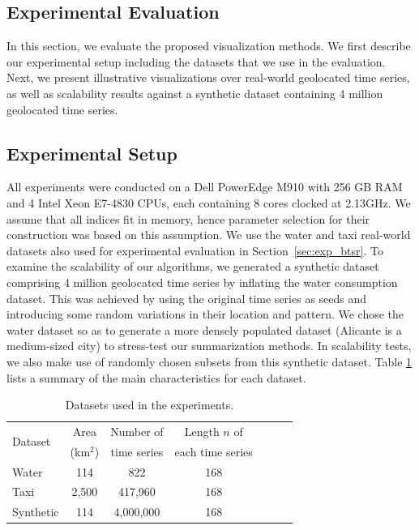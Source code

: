 
\subsection{Experimental Evaluation}
\label{sec:evaluation}

\graphicspath{{Papers/ElsevierBigDataResearch/}}

In this section, we evaluate the proposed visualization methods. We first describe our experimental setup including the datasets that we use in the evaluation. Next, we present illustrative visualizations over real-world geolocated time series, as well as scalability results against a synthetic dataset containing 4 million geolocated time series.

\subsection{Experimental Setup}
\label{subsec:exp_setup}

All experiments were conducted on a Dell PowerEdge M910 with 256 GB RAM and 4 Intel Xeon E7-4830 CPUs, each containing 8 cores clocked at 2.13GHz. We assume that all indices fit in memory, hence parameter selection for their construction was based on this assumption. We use the water and taxi real-world datasets also used for experimental evaluation in Section~\ref{sec:exp_btsr}. To examine the scalability of our algorithms, we generated a synthetic dataset comprising 4 million geolocated time series by inflating the water consumption dataset. This was achieved by using the original time series as seeds and introducing some random variations in their location and pattern. We chose the water dataset so as to generate a more densely populated dataset (Alicante is a medium-sized city) to stress-test our summarization methods. In scalability tests, we also make use of randomly chosen subsets from this synthetic dataset. Table \ref{tab:datasets_vis} lists a summary of the main characteristics for each dataset.

\begin{table}[ht]
	\centering
	\caption{Datasets used in the experiments.}
	\begin{small}
	\centering
	\begin{tabular}{lcccccc}
	\hline
	\multirow{2}{*}{Dataset} & Area & Number of & Length $n$ of \\
	 & (km$^2$) & time series & each time series \\
	\hline
	Water & 114 & 822 & 168 \\
	Taxi & 2,500 & 417,960 & 168 \\
	Synthetic & 114 & 4,000,000 & 168 \\
	\hline
	\end{tabular}
	\end{small}
	\label{tab:datasets_vis}
\end{table}

